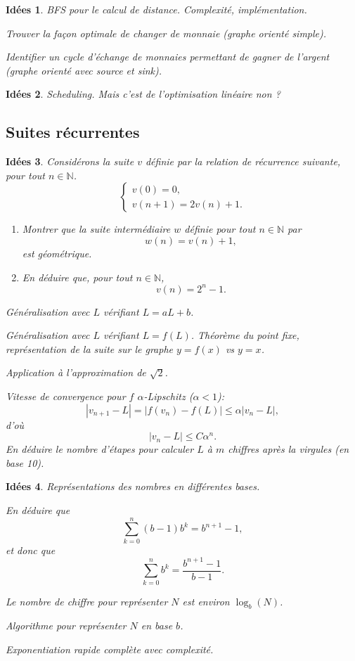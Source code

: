 \documentclass[a4paper,12pt, notitlepage]{article}
\theoremstyle{plain}
\newtheorem{idee}{Idées}
\newcommand{\N}{\mathbb{N}}
\begin{document}
\begin{idee}
	BFS pour le calcul de distance. Complexité, implémentation.
	
	Trouver la façon optimale de changer de monnaie (graphe orienté simple).
	
	Identifier un cycle d'échange de monnaies permettant de gagner de l'argent (graphe orienté avec source et sink).
\end{idee}

\begin{idee}
	Scheduling. Mais c'est de l'optimisation linéaire non ?
\end{idee}

\subsection{Suites récurrentes}

\begin{idee}
	Considérons la suite $v$ définie par la relation de récurrence suivante, pour tout $n\in\N$.
    \[
    \begin{cases}
        v(0) = 0, \\
        v(n+1) = 2v(n) + 1.
    \end{cases}
    \]
    \begin{enumerate}
        \item Montrer que la suite intermédiaire $w$ définie pour tout $n\in\N$ par
            \[ w(n) = v(n) + 1,\]
        est géométrique.
        \item En déduire que, pour tout $n\in\N$,
            \[ v(n) = 2^n - 1.\]
    \end{enumerate}
    
	Généralisation avec $L$ vérifiant $L = aL + b$.
	
	Généralisation avec $L$ vérifiant $L = f(L)$.
	Théorème du point fixe, représentation de la suite sur le graphe $y=f(x)$ vs $y=x$.
	
	Application à l'approximation de $\sqrt{2}$.
	
	Vitesse de convergence pour $f$ $\alpha$-Lipschitz ($\alpha < 1$):
		\[ |v_{n+1} - L| = |f(v_n) - f(L)| \leq \alpha |v_n - L|, \]
	d'où
		\[ |v_n - L| \leq C \alpha^n. \]
	En déduire le nombre d'étapes pour calculer $L$ à $m$ chiffres après la virgules (en base 10).
\end{idee}

\begin{idee}
	Représentations des nombres en différentes bases.
	
	En déduire que 
		\[ \sum_{k=0}^{n} (b-1)b^k = b^{n+1} - 1, \]
	et donc que 
		\[ \sum_{k=0}^n b^k = \dfrac{b^{n+1} - 1}{b-1}. \]
	
	Le nombre de chiffre pour représenter $N$ est environ $\log_b(N)$. 
	
	Algorithme pour représenter $N$ en base $b$.
	
	Exponentiation rapide complète avec complexité.
\end{idee}
\end{document}
